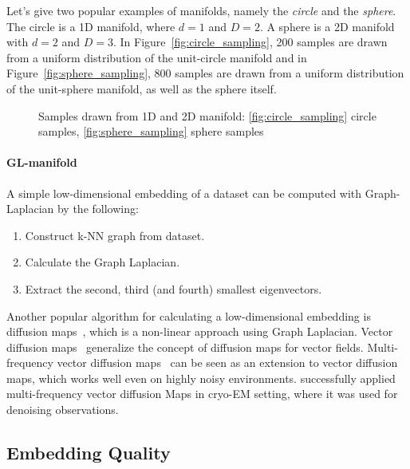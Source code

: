 Let's give two popular examples of manifolds, namely the \textit{circle} and the \textit{sphere}.
The circle is a 1D manifold, where $d=1$ and $D=2$. A sphere is a 2D manifold with $d=2$ and $D=3$.
In Figure~\ref{fig:circle_sampling}, 200 samples are drawn from a uniform distribution of the unit-circle manifold
and in Figure~\ref{fig:sphere_sampling}, 800 samples are drawn from a uniform distribution of the unit-sphere manifold,
as well as the sphere itself.

\begin{figure}[H]
    \hfill
    \hfill
    \hfill
        \caption{Samples drawn from 1D and 2D manifold: 
    \ref{fig:circle_sampling} circle samples,
    \ref{fig:sphere_sampling} sphere samples}
\end{figure}


\paragraph{GL-manifold}
\label{sec:manifold_calculation}
A simple low-dimensional embedding of a dataset can be computed with Graph-Laplacian by the following:

\begin{enumerate}
    \item Construct k-NN graph from dataset.
    \item Calculate the Graph Laplacian.
    \item Extract the second, third (and fourth) smallest eigenvectors.
\end{enumerate}

Another popular algorithm for calculating a low-dimensional embedding is diffusion maps~\cite{diffusionMaps}, 
which is a non-linear approach using Graph Laplacian.
Vector diffusion maps~\cite{vectorDiffusionMaps} generalize the concept of diffusion maps for vector fields.
Multi-frequency vector diffusion maps~\cite{multiDiffusionMaps} 
can be seen as an extension to vector diffusion maps, which works well even on highly noisy environments.
\citet{cryoEmMutliDM} successfully applied multi-frequency vector diffusion Maps in cryo-EM setting,
 where it was used for denoising observations.


\subsection{Embedding Quality}
\label{sec:embedding_quality}

